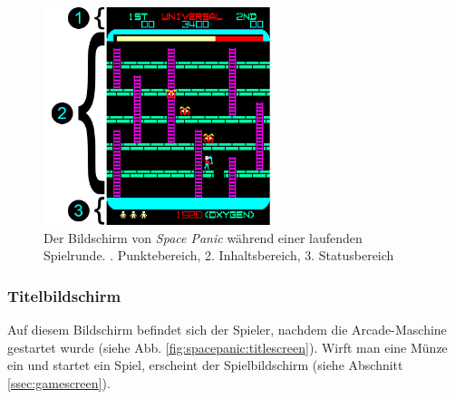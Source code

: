 \documentclass[12pt]{article}
\begin{document}
\begin{figure}[ht!]
          \centering
          \includegraphics[height=180pt]{images/spielbildschirm_mit_legende}
          \caption{Der Bildschirm von \textit{Space Panic} während einer laufenden Spielrunde. . Punktebereich, 2. Inhaltsbereich, 3. Statusbereich}
          \label{fig:spacepanic:gamescreen}
      \end{figure}




\subsubsection{Titelbildschirm} \label{ssec:titlescreen}
Auf diesem Bildschirm befindet sich der Spieler, nachdem die Arcade-Maschine gestartet wurde (siehe Abb. \ref{fig:spacepanic:titlescreen}). Wirft man eine Münze ein und startet ein Spiel, erscheint der Spielbildschirm (siehe Abschnitt \ref{ssec:gamescreen}).
\end{document}
